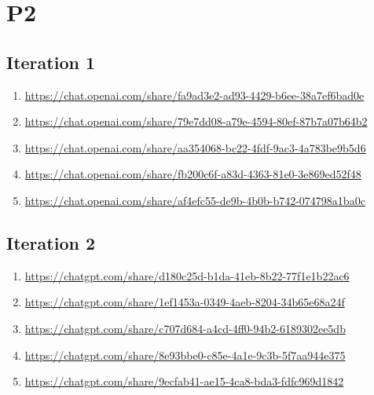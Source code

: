 \section{P2\label{P2-1}}

\subsection{Iteration 1}

\begin{enumerate}
    \item \href{https://chat.openai.com/share/fa9ad3e2-ad93-4429-b6ee-38a7ef6bad0e}{https://chat.openai.com/share/fa9ad3e2-ad93-4429-b6ee-38a7ef6bad0e}
    \item \href{https://chat.openai.com/share/79e7dd08-a79e-4594-80ef-87b7a07b64b2}{https://chat.openai.com/share/79e7dd08-a79e-4594-80ef-87b7a07b64b2}
    \item \href{https://chat.openai.com/share/aa354068-bc22-4fdf-9ac3-4a783be9b5d6}{https://chat.openai.com/share/aa354068-bc22-4fdf-9ac3-4a783be9b5d6}
    \item \href{https://chat.openai.com/share/fb200c6f-a83d-4363-81e0-3e869ed52f48}{https://chat.openai.com/share/fb200c6f-a83d-4363-81e0-3e869ed52f48}
    \item \href{https://chat.openai.com/share/af4efc55-de9b-4b0b-b742-074798a1ba0c}{https://chat.openai.com/share/af4efc55-de9b-4b0b-b742-074798a1ba0c}
\end{enumerate}

\subsection{Iteration 2}

\begin{enumerate}
    \item \href{https://chatgpt.com/share/d180c25d-b1da-41eb-8b22-77f1e1b22ac6}{https://chatgpt.com/share/d180c25d-b1da-41eb-8b22-77f1e1b22ac6}
    \item \href{https://chatgpt.com/share/1ef1453a-0349-4aeb-8204-34b65e68a24f}{https://chatgpt.com/share/1ef1453a-0349-4aeb-8204-34b65e68a24f}
    \item \href{https://chatgpt.com/share/c707d684-a4cd-4ff0-94b2-6189302ee5db}{https://chatgpt.com/share/c707d684-a4cd-4ff0-94b2-6189302ee5db}
    \item \href{https://chatgpt.com/share/8e93bbe0-c85e-4a1e-9c3b-5f7aa944e375}{https://chatgpt.com/share/8e93bbe0-c85e-4a1e-9c3b-5f7aa944e375}
    \item \href{https://chatgpt.com/share/9ecfab41-ae15-4ca8-bda3-fdfc969d1842}{https://chatgpt.com/share/9ecfab41-ae15-4ca8-bda3-fdfc969d1842}
\end{enumerate}

